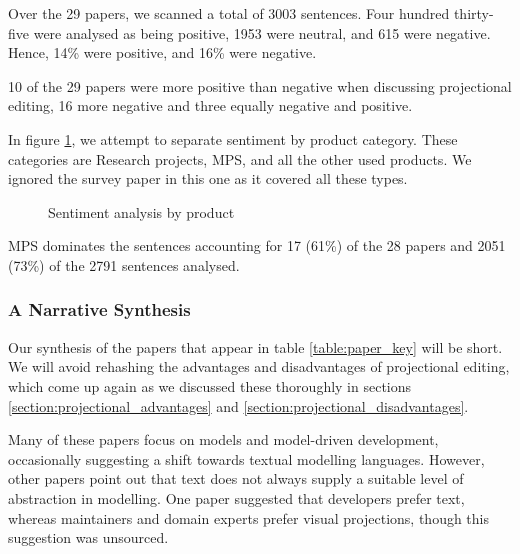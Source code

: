 Over the 29 papers, we scanned a total of 3003 sentences.
Four hundred thirty-five were analysed as being positive, 1953 were neutral, and 615 were negative.
Hence, 14\% were positive, and 16\% were negative.

10 of the 29 papers were more positive than negative when discussing projectional editing, 16 more negative and three equally negative and positive.

In figure \ref{fig:sentiment_analysis2}, we attempt to separate sentiment by product category.  
These categories are Research projects, MPS, and all the other used products.
We ignored the survey paper in this one as it covered all these types.

\begin{figure}[H]
    \centering
    \caption{Sentiment analysis by product}
    \label{fig:sentiment_analysis2}
\end{figure}

MPS dominates the sentences accounting for 17 (61\%) of the 28 papers and 2051 (73\%) of the 2791 sentences analysed.

\subsubsection{A Narrative Synthesis}
Our synthesis of the papers that appear in table \ref{table:paper_key} will be short.
We will avoid rehashing the advantages and disadvantages of projectional editing, which come up again as we discussed these thoroughly in sections \ref{section:projectional_advantages} and \ref{section:projectional_disadvantages}.

Many of these papers focus on models and model-driven development, occasionally suggesting a shift towards textual modelling languages.
However, other papers point out that text does not always supply a suitable level of abstraction in modelling.
One paper suggested that developers prefer text, whereas maintainers and domain experts prefer visual projections, though this suggestion was unsourced.

